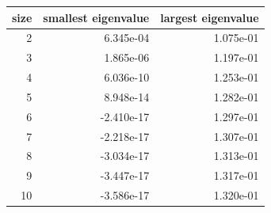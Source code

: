 \begin{tabular}{rrr}
\toprule
size & smallest eigenvalue & largest eigenvalue\\
\midrule
2 & 6.345e-04 & 1.075e-01\\
3 & 1.865e-06 & 1.197e-01\\
4 & 6.036e-10 & 1.253e-01\\
5 & 8.948e-14 & 1.282e-01\\
6 & -2.410e-17 & 1.297e-01\\
7 & -2.218e-17 & 1.307e-01\\
8 & -3.034e-17 & 1.313e-01\\
9 & -3.447e-17 & 1.317e-01\\
10 & -3.586e-17 & 1.320e-01\\
\bottomrule
\end{tabular}